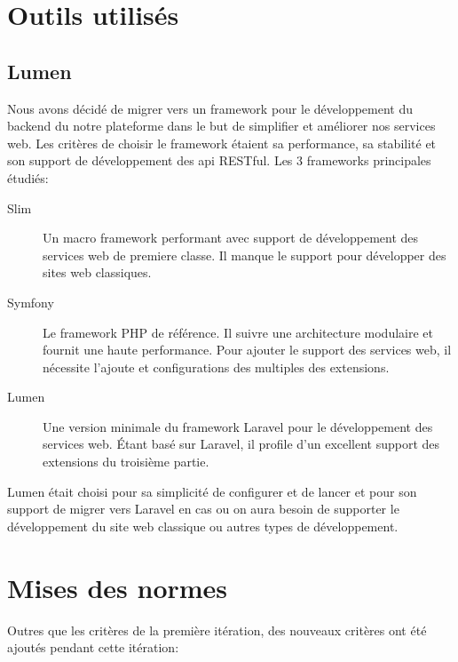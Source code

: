 
\section{Outils utilisés}

\subsection{Lumen}

Nous avons décidé de migrer vers un framework pour le développement du backend
du notre plateforme dans le but de simplifier et améliorer nos services web.
Les critères de choisir le framework étaient sa performance, sa stabilité et
son support de développement des api RESTful. Les 3 frameworks principales
étudiés:

\begin{description}
    \item [Slim] Un macro framework performant avec support de développement
        des services web de premiere classe. Il manque le support pour
        développer des sites web classiques.
    \item [Symfony] Le framework PHP de référence. Il suivre une architecture
        modulaire et fournit une haute performance. Pour ajouter le support des
        services web, il nécessite l'ajoute et configurations des multiples des
        extensions.
    \item [Lumen] Une version minimale du framework Laravel pour le
        développement des services web. Étant basé sur Laravel, il profile d'un
        excellent support des extensions du troisième partie.
\end{description}

Lumen était choisi pour sa simplicité de configurer et de lancer et pour son
support de migrer vers Laravel en cas ou on aura besoin de supporter le
développement du site web classique ou autres types de développement.

\section{Mises des normes}

Outres que les critères de la première itération, des nouveaux critères ont
été ajoutés pendant cette itération:

